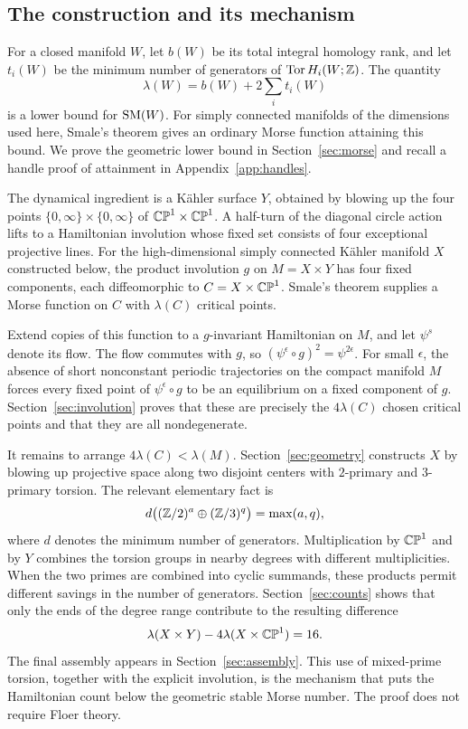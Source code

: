 

\subsection*{The construction and its mechanism}
For a closed manifold $W$, let $b(W)$ be its total integral homology rank, and let $t_i(W)$ be the minimum number of generators of $\operatorname{Tor} H_i(W;\mathbb Z)$. The quantity
\[
 \lambda(W)=b(W)+2\sum_i t_i(W)
\]
is a lower bound for $\operatorname{SM}(W)$. For simply connected manifolds of the dimensions used here, Smale's theorem gives an ordinary Morse function attaining this bound. We prove the geometric lower bound in Section~\ref{sec:morse} and recall a handle proof of attainment in Appendix~\ref{app:handles}.

The dynamical ingredient is a Kähler surface $Y$, obtained by blowing up the four points $\{0,\infty\}\times\{0,\infty\}$ of $\mathbb{CP}^1\times\mathbb{CP}^1$. A half-turn of the diagonal circle action lifts to a Hamiltonian involution whose fixed set consists of four exceptional projective lines. For the high-dimensional simply connected Kähler manifold $X$ constructed below, the product involution $g$ on $M=X\times Y$ has four fixed components, each diffeomorphic to $C=X\times\mathbb{CP}^1$. Smale's theorem supplies a Morse function on $C$ with $\lambda(C)$ critical points.

Extend copies of this function to a $g$-invariant Hamiltonian on $M$, and let $\psi^s$ denote its flow. The flow commutes with $g$, so $(\psi^\epsilon\circ g)^2=\psi^{2\epsilon}$. For small $\epsilon$, the absence of short nonconstant periodic trajectories on the compact manifold $M$ forces every fixed point of $\psi^\epsilon\circ g$ to be an equilibrium on a fixed component of $g$. Section~\ref{sec:involution} proves that these are precisely the $4\lambda(C)$ chosen critical points and that they are all nondegenerate.

It remains to arrange $4\lambda(C)<\lambda(M)$. Section~\ref{sec:geometry} constructs $X$ by blowing up projective space along two disjoint centers with $2$-primary and $3$-primary torsion. The relevant elementary fact is
\[
 d\bigl((\mathbb Z/2)^a\oplus(\mathbb Z/3)^q\bigr)=\max(a,q),
\]
where $d$ denotes the minimum number of generators. Multiplication by $\mathbb{CP}^1$ and by $Y$ combines the torsion groups in nearby degrees with different multiplicities. When the two primes are combined into cyclic summands, these products permit different savings in the number of generators. Section~\ref{sec:counts} shows that only the ends of the degree range contribute to the resulting difference
\[
 \lambda(X\times Y)-4\lambda(X\times\mathbb{CP}^1)=16.
\]
The final assembly appears in Section~\ref{sec:assembly}. This use of mixed-prime torsion, together with the explicit involution, is the mechanism that puts the Hamiltonian count below the geometric stable Morse number. The proof does not require Floer theory.
